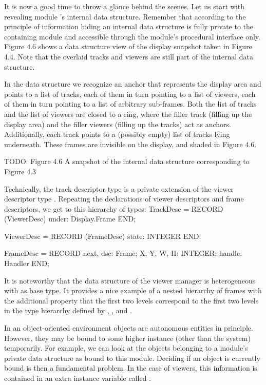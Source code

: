 It is now a good time to throw a glance behind the scenes. Let us
start with revealing module ’s internal data structure. Remember
that according to the principle of information hiding an internal data
structure is fully private to the containing module and accessible
through the module’s procedural interface only. Figure 4.6 shows a
data structure view of the display snapshot taken in Figure 4.4. Note
that the overlaid tracks and viewers are still part of the internal
data structure.

In the data structure we recognize an anchor that represents the
display area and points to a list of tracks, each of them in turn
pointing to a list of viewers, each of them in turn pointing to a list
of arbitrary sub-frames. Both the list of tracks and the list of
viewers are closed to a ring, where the filler track (filling up the
display area) and the filler viewers (filling up the tracks) act as
anchors. Additionally, each track points to a (possibly empty) list of
tracks lying underneath. These frames are invisible on the display,
and shaded in Figure 4.6.

TODO: Figure 4.6 A snapshot of the internal data structure corresponding to Figure 4.3

Technically, the track descriptor type  is a private
extension of the viewer descriptor type . Repeating the
declarations of viewer descriptors and frame descriptors, we get to
this hierarchy of types:
\begintt
TrackDesc = RECORD (ViewerDesc)
  under: Display.Frame
END;

ViewerDesc = RECORD (FrameDesc)
  state: INTEGER
END;

FrameDesc = RECORD
  next, dsc: Frame;
  X, Y, W, H: INTEGER;
  handle: Handler
END;
\endtt

\noindent It is noteworthy that the data structure of the viewer
manager is heterogeneous with  as base type. It provides
a nice example of a nested hierarchy of frames with the additional
property that the first two levels correspond to the first two levels
in the type hierarchy defined by , , and .


In an object-oriented environment objects are autonomous entities in
principle. However, they may be bound to some higher instance (other
than the system) temporarily. For example, we can look at the objects
belonging to a module's private data structure as bound to this
module. Deciding if an object is currently bound is then a fundamental
problem. In the case of viewers, this information is contained in an
extra instance variable called .

